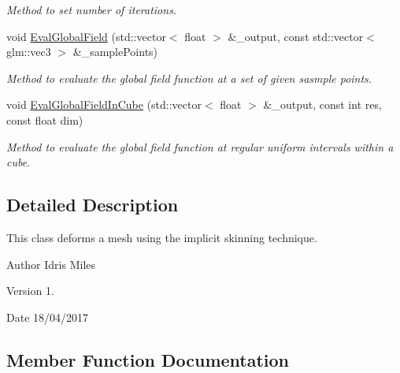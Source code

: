 \begin{DoxyCompactItemize}
\begin{DoxyCompactList}\small\item\em Method to set number of iterations. \end{DoxyCompactList}\item 
void \hyperlink{classImplicitSkinDeformer_a53fe153bdf7345773a2b1d2ad4b2698e}{Eval\+Global\+Field} (std\+::vector$<$ float $>$ \&\+\_\+output, const std\+::vector$<$ glm\+::vec3 $>$ \&\+\_\+sample\+Points)
\begin{DoxyCompactList}\small\item\em Method to evaluate the global field function at a set of given sasmple points. \end{DoxyCompactList}\item 
void \hyperlink{classImplicitSkinDeformer_a8b9c5d17557ec3cf44ed982a8930e890}{Eval\+Global\+Field\+In\+Cube} (std\+::vector$<$ float $>$ \&\+\_\+output, const int res, const float dim)
\begin{DoxyCompactList}\small\item\em Method to evaluate the global field function at regular uniform intervals within a cube. \end{DoxyCompactList}\end{DoxyCompactItemize}


\subsection{Detailed Description}
This class deforms a mesh using the implicit skinning technique. 

\begin{DoxyAuthor}{Author}
Idris Miles 
\end{DoxyAuthor}
\begin{DoxyVersion}{Version}
1. 
\end{DoxyVersion}
\begin{DoxyDate}{Date}
18/04/2017 
\end{DoxyDate}


\subsection{Member Function Documentation}
